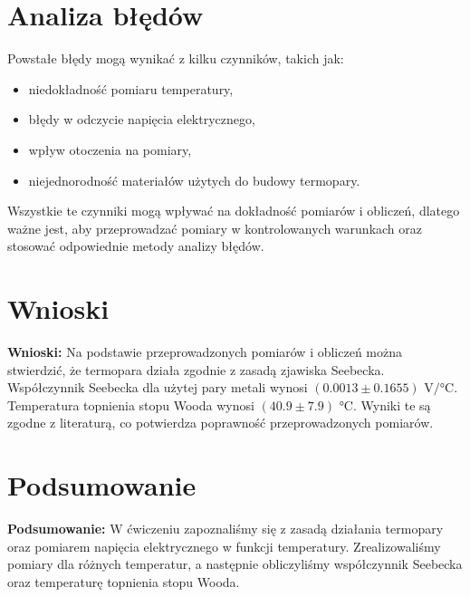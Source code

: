 \documentclass[11pt]{article}
\begin{document}
\section*{Analiza błędów}
Powstałe błędy mogą wynikać z kilku czynników, takich jak:
\begin{itemize}
    \item niedokładność pomiaru temperatury,
    \item błędy w odczycie napięcia elektrycznego,
    \item wpływ otoczenia na pomiary,
    \item niejednorodność materiałów użytych do budowy termopary.
\end{itemize}
Wszystkie te czynniki mogą wpływać na dokładność pomiarów i obliczeń, dlatego ważne jest, aby przeprowadzać pomiary w kontrolowanych warunkach oraz stosować odpowiednie metody analizy błędów.
\section*{Wnioski}
\textbf{Wnioski:} Na podstawie przeprowadzonych pomiarów i obliczeń można stwierdzić, że termopara działa zgodnie z zasadą zjawiska Seebecka. 
Współczynnik Seebecka dla użytej pary metali wynosi \( (0.0013 \pm 0.1655) \text{ V/°C} \). Temperatura topnienia stopu Wooda wynosi \( (40.9 \pm 7.9) \text{ °C} \). 
Wyniki te są zgodne z literaturą, co potwierdza poprawność przeprowadzonych pomiarów.
\section*{Podsumowanie}
\textbf{Podsumowanie:} W ćwiczeniu zapoznaliśmy się z zasadą działania termopary oraz pomiarem napięcia elektrycznego w funkcji temperatury.
Zrealizowaliśmy pomiary dla różnych temperatur, a następnie obliczyliśmy współczynnik Seebecka oraz temperaturę topnienia stopu Wooda.
\end{document}

